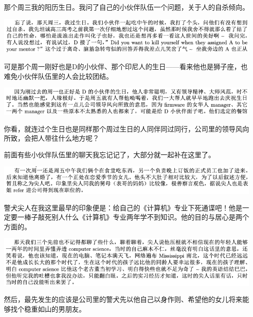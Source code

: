 \documentclass[9pt, b5paper]{article}
\begin{document}
那个周三我的阳历生日。我问了自己的小伙伴队伍一个问题，关于人的自杀倾向。 

\begin{center}
\includegraphics[width=.9\linewidth]{./pic/backups_plans_20210513_104550.png}
\end{center}

可是那个周一刚好也是D的小伙伴、那个印尼人的生日——看来他也是狮子座，也难免小伙伴队伍里的人会比较团结。 

\begin{center}
\includegraphics[width=.9\linewidth]{./pic/backups_plans_20210513_104732.png}
\end{center}

你看，就连过个生日也是同样那个周过生日的人同伴同过同行，公司里的领导风向所致，会把人带往什么地方呢？

前面有些小伙伴队伍里的聊天我忘记记了，大部分就一起补在这里了。 

\begin{center}
\includegraphics[width=.9\linewidth]{./pic/backups_plans_20210513_105033.png}
\end{center}

警犬尖人在我这里最早的印象便是：给自己的《计算机》专业下死通谍吧！他是一定要一棒子敲死别人什么《计算机》专业两年学不到知识。他的目的与居心是两个方面的。  

\begin{center}
\includegraphics[width=.9\linewidth]{./pic/backups_plans_20210513_105400.png}
\end{center}

然后，最先发生的应该是公司里的警犬先以他自己以身作则、希望他的女儿将来能够找个稳重如山的男朋友。 
\end{document}
